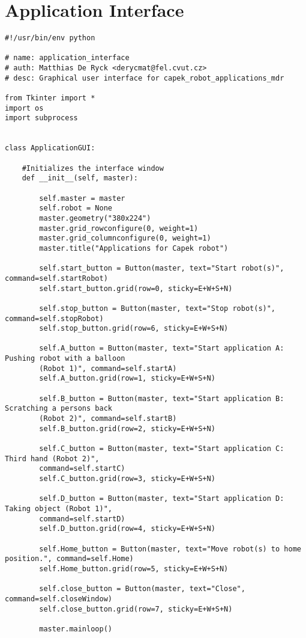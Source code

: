 \chapter{Application Interface}

\begin{lstlisting}
#!/usr/bin/env python

# name: application_interface
# auth: Matthias De Ryck <derycmat@fel.cvut.cz>
# desc: Graphical user interface for capek_robot_applications_mdr

from Tkinter import *
import os
import subprocess


class ApplicationGUI:

	#Initializes the interface window
	def __init__(self, master):

		self.master = master
		self.robot = None
		master.geometry("380x224")
		master.grid_rowconfigure(0, weight=1)
		master.grid_columnconfigure(0, weight=1)
		master.title("Applications for Capek robot")

		self.start_button = Button(master, text="Start robot(s)", command=self.startRobot)
		self.start_button.grid(row=0, sticky=E+W+S+N)

		self.stop_button = Button(master, text="Stop robot(s)", command=self.stopRobot)
		self.stop_button.grid(row=6, sticky=E+W+S+N)

		self.A_button = Button(master, text="Start application A: Pushing robot with a balloon
		(Robot 1)", command=self.startA)
		self.A_button.grid(row=1, sticky=E+W+S+N)

		self.B_button = Button(master, text="Start application B: Scratching a persons back 
		(Robot 2)", command=self.startB)
		self.B_button.grid(row=2, sticky=E+W+S+N)

 		self.C_button = Button(master, text="Start application C: Third hand (Robot 2)",
		command=self.startC)
		self.C_button.grid(row=3, sticky=E+W+S+N)

		self.D_button = Button(master, text="Start application D: Taking object (Robot 1)",
		command=self.startD)
		self.D_button.grid(row=4, sticky=E+W+S+N)

		self.Home_button = Button(master, text="Move robot(s) to home position.", command=self.Home)
		self.Home_button.grid(row=5, sticky=E+W+S+N)

		self.close_button = Button(master, text="Close", command=self.closeWindow)
		self.close_button.grid(row=7, sticky=E+W+S+N)

		master.mainloop()



\end{lstlisting}
